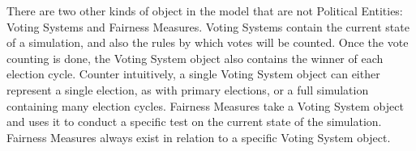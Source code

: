 \documentclass[12pt]{article}
\begin{document}
\qquad There are two other kinds of object in the model that are not Political Entities: Voting Systems and Fairness Measures. Voting Systems contain the current state of a simulation, and also the rules by which votes will be counted. Once the vote counting is done, the Voting System object also contains the winner of each election cycle. Counter intuitively, a single Voting System object can either represent a single election, as with primary elections, or a full simulation containing many election cycles. Fairness Measures take a Voting System object and uses it to conduct a specific test on the current state of the simulation. Fairness Measures always exist in relation to a specific Voting System object. \\

\end{document}
